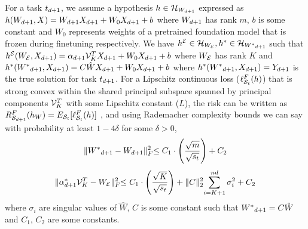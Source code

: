 \begin{theorem}
    For a task $t_{d+1}$, we assume a hypothesis $h\in\mathcal{H}_{W_{d+1}}$ expressed as $h(W_{d+1},X)=W_{d+1} X_{d+1}+W_0X_{d+1}+b$ where $W_{d+1}$ has rank $m$, $b$ is some constant and $W_0$ represents weights of a pretrained foundation model that is frozen during finetuning respectively. We have $h^{\mathcal{E}}\in\mathcal{H}_{W_{\mathcal{E}}}, h^{*}\in\mathcal{H}_{{W^*}_{d+1}}$ such that $h^{\mathcal{E}}(W_{\mathcal{E}},X_{d+1}) = \alpha_{d+1}\mathcal{V}^T_{K} X_{d+1}+W_0X_{d+1}+b$ where $W_{\mathcal{E}}$ has rank $K$ and $h^{*}({W^*}_{d+1},X_{d+1}) = C\hat{W} X_{d+1} + W_0X_{d+1}+b$ where $h^{*}({W^*}_{d+1},X_{d+1})=Y_{d+1}$ is the true solution for task $t_{d+1}$. For a Lipschitz continuous loss ($\mathcal{\ell}_{\mathcal{S}_t}^F(h)$) that is strong convex within the shared principal subspace spanned by principal components $\mathcal{V}^T_{K}$  with some Lipschitz constant ($L$), the risk can be written as $R_{\mathcal{S}_{d+1}}^F(h_W) = E_{\mathcal{S}_t}[\mathcal{\ell}_{\mathcal{S}_t}^F(h) ]$ , and using Rademacher complexity bounds we can say with probability at least $1-4\delta$ for some $\delta>0$,
    \begin{equation}
    \label{equation:eq2}
        \Vert {W^*}_{d+1} - W_{d+1}\lVert^2_F \leq C_1\cdot\Bigg(\frac{\sqrt{m}}{\sqrt{s_t}} \Bigg) + C_2
    \end{equation}
    \begin{equation}
    \label{equation:eq1}
        \Vert \alpha^{*}_{d+1}\mathcal{V}^T_{K} - W_{\mathcal{E}}\lVert^2_F \leq C_1\cdot\Bigg(\frac{\sqrt{K}}{\sqrt{s_t}} \Bigg) + \lVert C\lVert^2_2\sum_{i=K+1}^{nd}\sigma^2_i + C_2
    \end{equation}
    where $\sigma_i$ are singular values of $\hat{W}$, $C$ is some constant such that ${W^*}_{d+1}=C\hat{W}$ and $C_1$, $C_2$ are some constants.


\end{theorem}
